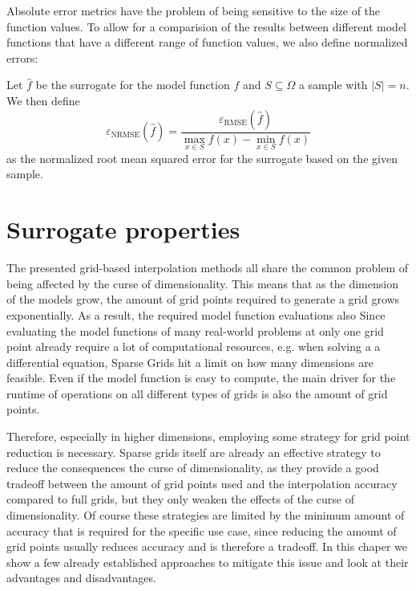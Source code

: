 \documentclass[
  a4paper,  %
  twoside,  %
  bibliography=totoc,
  headsepline,
  cleardoublepage=empty,
  parskip=half,
  draft=false
]{scrbook}
\begin{document}
Absolute error metrics have the problem of being sensitive to the size of the function values.
To allow for a comparision of the results between different model functions that have a different range of function values, we also define normalized errors:
\begin{definition}
Let $\hat{f}$ be the surrogate for the model function $f$ and $S \subseteq \Omega$ a sample with $|S|=n$.
We then define
\begin{equation}
\varepsilon_{\text{NRMSE}}(\hat{f}) = \frac{\varepsilon_{\text{RMSE}}(\hat{f})}{\max_{x \in S} f(x) - \min_{x \in S} f(x)}
\end{equation}
as the normalized root mean squared error for the surrogate based on the given sample.
\end{definition}


\chapter{Surrogate properties}

The presented grid-based interpolation methods all share the common problem of being affected by the curse of dimensionality.
This means that as the dimension of the models grow, the amount of grid points required to generate a grid grows exponentially.
As a result, the required model function evaluations also
Since evaluating the model functions of many real-world problems at only one grid point already require a lot of computational resources, e.g. when solving a a differential equation, Sparse Grids hit a limit on how many dimensions are feasible.
Even if the model function is easy to compute, the main driver for the runtime of operations on all different types of grids is also the amount of grid points.

Therefore, especially in higher dimensions, employing some strategy for grid point reduction is necessary.
Sparse grids itself are already an effective strategy to reduce the consequences the curse of dimensionality, as they provide a good tradeoff between the amount of grid points used and the interpolation accuracy compared to full grids, but they only weaken the effects of the curse of dimensionality.
Of course these strategies are limited by the minimum amount of accuracy that is required for the specific use case, since reducing the amount of grid points usually reduces accuracy and is therefore a tradeoff.
In this chaper we show a few already established approaches to mitigate this issue and look at their advantages and disadvantages.
\end{document}
